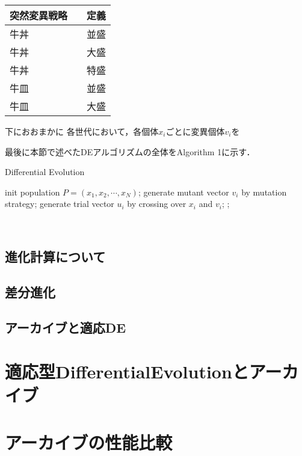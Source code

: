 \documentclass[a4paper,11pt,oneside,openany]{jsbook}
\begin{document}
\begin{table}[htb]
  \begin{tabular}{lr} \hline
    突然変異戦略　& 定義  \\ \hline
    牛丼 & 並盛 \\
    牛丼 & 大盛 \\
    牛丼 & 特盛 \\
    牛皿 & 並盛 \\
    牛皿 & 大盛 \\ \hline
  \end{tabular}
\end{table}

下におおまかに
各世代において，各個体${x_i}$ごとに変異個体${v_i}$を

最後に本節で述べたDEアルゴリズムの全体をAlgorithm 1に示す．
\begin{algorithm}                      
\caption{Differential Evolution}         
\label{alg:pbnf}                          
\begin{algorithmic}  
\STATE init population ${P} = (x_1, x_2, \cdots, x_N)$;
        \STATE generate mutant vector {$v_i$} by mutation strategy;
        \STATE generate trial vector {$u_i$} by crossing over {$x_i$} and {$v_i$}; 
    \ENDFOR
      ;
    \ENDIF
    \ENDFOR
\ENDWHILE
\end{algorithmic}
\end{algorithm}　　　　　　　　　　　　　　　　　　　　　


\section{進化計算について}
\section{差分進化}
\section{アーカイブと適応DE}
\chapter{適応型DifferentialEvolutionとアーカイブ}
\chapter{アーカイブの性能比較}
\end{document}
